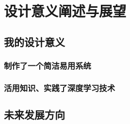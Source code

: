 
\chapter{设计意义阐述与展望}

\section{我的设计意义}

\subsection{制作了一个简洁易用系统}

\subsection{活用知识、实践了深度学习技术}

\section{未来发展方向}




